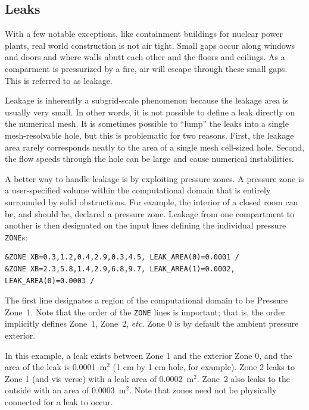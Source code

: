 \documentclass[11pt]{book}
\newcommand{\ct}{\tt\small}
\begin{document}
\subsection{Leaks}
\label{info:Leaks}

With a few notable exceptions, like containment buildings for nuclear power plants, real world construction is not air tight.  Small gaps occur along windows and doors and where walls abutt each other and the floors and ceilings.  As a comparment is pressurized by a fire, air will escape through these small gaps.  This is referred to as leakage.

Leakage is inherently a subgrid-scale phenomenon because the leakage area is usually very small. In other words, it is not possible to define a leak directly on the
numerical mesh. It is sometimes possible to ``lump'' the leaks into a single mesh-resolvable hole, but this is problematic
for two reasons. First, the leakage area rarely corresponds neatly to the area of a single mesh cell-sized hole. Second, the
flow speeds through the hole can be large and cause numerical instabilities.

A better way to handle leakage is by exploiting pressure zones. A pressure zone is a user-specified volume within the computational domain that is
entirely surrounded by solid obstructions. For example, the interior of a closed room can be, and should be, declared a pressure zone. Leakage from one
compartment to another is then designated on the input lines defining the individual pressure {\ct ZONE}s:

\footnotesize
\begin{verbatim}
&ZONE XB=0.3,1.2,0.4,2.9,0.3,4.5, LEAK_AREA(0)=0.0001 /
&ZONE XB=2.3,5.8,1.4,2.9,6.8,9.7, LEAK_AREA(1)=0.0002, LEAK_AREA(0)=0.0003 /
\end{verbatim}
\normalsize

\noindent
The first line designates a region of the computational domain to be Pressure Zone~1. Note that the order of the {\ct ZONE} lines is important; that is, the order
implicitly defines Zone~1, Zone~2, {\em etc.}
Zone 0 is by default the ambient pressure exterior.


In this example, a leak exists between Zone 1 and the exterior Zone 0, and the area of the leak
is 0.0001~m$^2$ (1 cm by 1 cm hole, for example). Zone 2 leaks to Zone 1 (and vis verse)
with a leak area of 0.0002~m$^2$. Zone~2 also leaks to the outside with an area of 0.0003~m$^2$. Note that zones need not be physically connected for a leak to occur.
\end{document}
